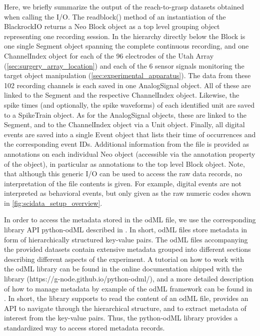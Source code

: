 {Here, we briefly summarize the output of the reach-to-grasp datasets obtained when calling the I/O. The readblock() method of an instantiation of the BlackrockIO returns a Neo Block object as a top level grouping object representing one recording session. In the hierarchy directly below the Block is one single Segment object spanning the complete continuous recording, and one ChannelIndex object for each of the 96 electrodes of the Utah Array (\ref{sec:surgery_array_location}) and each of the 6 sensor signals monitoring the target object manipulation (\cref{sec:experimental_apparatus}). The data from these 102 recording channels is each saved in one AnalogSignal object. All of these are linked to the Segment and the respective ChannelIndex object. Likewise, the spike times (and optionally, the spike waveforms) of each identified unit are saved to a SpikeTrain object. As for the AnalogSignal objects, these are linked to the Segment, and to the ChannelIndex object via a Unit object. Finally, all digital events are saved into a single Event object that lists their time of occurrences and the corresponding event IDs. Additional information from the file is provided as annotations on each individual Neo object (accessible via the annotation property of the object), in particular as annotations to the top level Block object. Note, that although this generic I/O can be used to access the raw data records, no interpretation of the file contents is given. For example, digital events are not interpreted as behavioral events, but only given as the raw numeric codes shown in \cref{fig:scidata_setup_overview}. 

In order to access the metadata stored in the odML file, we use the corresponding library API python-odML described in \cite{Grewe_2011}. In short, odML files store metadata in form of hierarchically structured key-value pairs. The odML files accompanying the provided datasets contain extensive metadata grouped into different sections describing different aspects of the experiment. A tutorial on how to work with the odML library can be found in the online documentation shipped with the library (https://g-node.github.io/python-odml/), and a more detailed description of how to manage metadata by example of the odML framework can be found in \cite{Zehl_2016}. In short, the library supports to read the content of an odML file, provides an API to navigate through the hierarchical structure, and to extract metadata of interest from the key-value pairs. Thus, the python-odML library provides a standardized way to access stored metadata records. 

}

